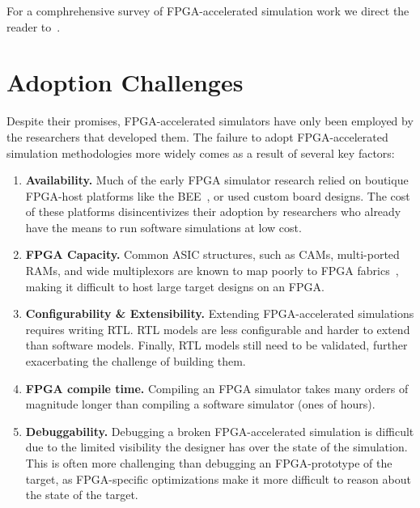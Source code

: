 For a comphrehensive survey of FPGA-accelerated simulation work we direct
the reader to~\cite{fpgasimbook}.

\section{Adoption Challenges}

Despite their promises, FPGA-accelerated simulators have only been employed by
the researchers that developed them. The failure to adopt FPGA-accelerated
simulation methodologies more widely comes as a result of several key factors:

\begin{enumerate}

    \item \textbf{Availability.} Much of the early FPGA simulator research
        relied on boutique FPGA-host platforms like the BEE~\cite{bee2}, or
        used custom board designs. The cost of these platforms disincentivizes
        their adoption by researchers who already have the means to run
        software simulations at low cost.

    \item \textbf{FPGA Capacity.} Common ASIC structures, such as CAMs,
        multi-ported RAMs, and wide multiplexors are known to map poorly to
        FPGA fabrics~\cite{fpgagap, fpgagap2}, making it difficult to host
        large target designs on an FPGA.

    \item \textbf{Configurability \& Extensibility.} Extending FPGA-accelerated
        simulations requires writing RTL. RTL models are less configurable and
        harder to extend than software models. Finally, RTL models still need
        to be validated, further exacerbating the challenge of building them.

    \item \textbf{FPGA compile time.} Compiling an FPGA simulator takes many
        orders of magnitude longer than compiling a software simulator (ones of hours).

    \item \textbf{Debuggability.} Debugging a broken FPGA-accelerated
        simulation is difficult due to the limited visibility the designer has
        over the state of the simulation. This is often more challenging than
        debugging an FPGA-prototype of the target, as FPGA-specific
        optimizations make it more difficult to reason about the state of the
        target.

\end{enumerate}

